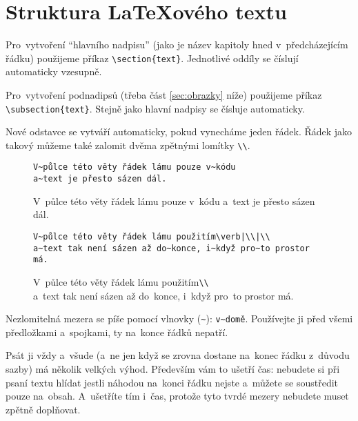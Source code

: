 \clearpage
\section[Struktura LaTeXového ]{Struktura \LaTeX{}ového textu}

Pro~vytvoření \enquote{hlavního nadpisu} (jako je název kapitoly hned v~předcházejícím řádku) použijeme příkaz \verb|\section{text}|.
Jednotlivé oddíly se číslují automaticky vzesupně.

Pro~vytvoření podnadipsů (třeba část \ref{sec:obrazky} níže) použijeme příkaz  \verb|\subsection{text}|.
Stejně jako hlavní nadpisy se čísluje automaticky.

Nové odstavce se vytváří automaticky, pokud vynecháme jeden řádek.
Řádek jako takový můžeme také zalomit dvěma zpětnými lomítky \verb|\\|.

\begin{figure}[ht]
\onehalfspacing
\begin{mdframed}
\begin{verbatim}
V~půlce této věty řádek lámu pouze v~kódu
a~text je přesto sázen dál.
\end{verbatim}

V~půlce této věty řádek lámu pouze v~kódu
a~text je přesto sázen dál.

\begin{verbatim}
V~půlce této věty řádek lámu použitím\verb|\\|\\
a~text tak není sázen až do~konce, i~když pro~to prostor má.
\end{verbatim}

V~půlce této věty řádek lámu použitím\verb|\\|\\
a~text tak není sázen až do~konce, i~když pro~to prostor má.
\end{mdframed}
\end{figure}

Nezlomitelná mezera se píše pomocí vlnovky (\texttt{\~}): \verb|v~domě|.
Používejte ji před všemi předložkami a~spojkami, ty na~konce řádků nepatří.

Psát ji vždy a~všude (a~ne jen když se zrovna dostane na~konec řádku z~důvodu sazby) má několik velkých výhod.
Především vám to ušetří čas: nebudete si při psaní textu hlídat jestli náhodou na~konci řádku nejste a~můžete se soustředit pouze na~obsah.
A~ušetříte tím i~čas, protože tyto tvrdé mezery nebudete muset zpětně doplňovat.

